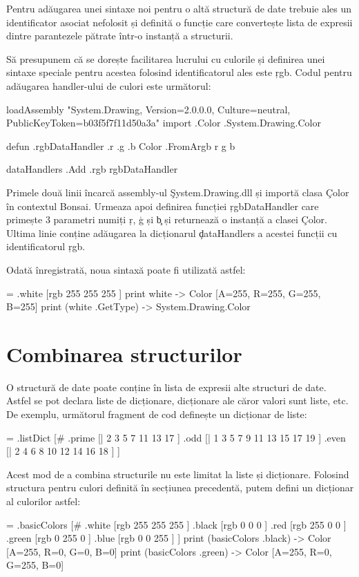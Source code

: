\documentclass[12pt,a4paper]{memoir}
\begin{document}
Pentru adăugarea unei sintaxe noi pentru o altă structură de date trebuie ales un identificator asociat nefolosit și definită o funcție care convertește lista de expresii dintre parantezele pătrate într-o instanță a structurii.

Să presupunem că se dorește facilitarea lucrului cu culorile și definirea unei sintaxe speciale pentru acestea folosind identificatorul ales este \c{rgb}. Codul pentru adăugarea handler-ului de culori este următorul:
\begin{code}
loadAssembly "System.Drawing, Version=2.0.0.0, Culture=neutral,
    PublicKeyToken=b03f5f7f11d50a3a"
import .Color .System.Drawing.Color

defun .rgbDataHandler .r .g .b {
	Color .FromArgb r g b
}

dataHandlers .Add .rgb rgbDataHandler
\end{code}
Primele două linii încarcă assembly-ul \c{System.Drawing.dll} și importă clasa \c{Color} în contextul Bonsai. Urmeaza apoi definirea funcției \c{rgbDataHandler} care primește 3 parametri numiți \c{r}, \c{g} și \c{b} și returnează o instanță a clasei \c{Color}. Ultima linie conține adăugarea la dicționarul \c{dataHandlers} a acestei funcții cu identificatorul \c{rgb}. 

Odată înregistrată, noua sintaxă poate fi utilizată astfel:
\begin{code}
= .white [rgb 255 255 255 ]
print white
  -> Color [A=255, R=255, G=255, B=255]
print (white .GetType)
  -> System.Drawing.Color
\end{code}

\section{Combinarea structurilor}

O structură de date poate conține în lista de expresii alte structuri de date. Astfel se pot declara liste de dicționare, dicționare ale căror valori sunt liste, etc. De exemplu, următorul fragment de cod definește un dicționar de liste:
\begin{code}
= .listDict [#
  .prime [| 2 3 5 7 11 13 17 ]
  .odd [| 1 3 5 7 9 11 13 15 17 19 ]
  .even [| 2 4 6 8 10 12 14 16 18 ]
]
\end{code}

Acest mod de a combina structurile nu este limitat la liste și dicționare. Folosind structura pentru culori definită în secțiunea precedentă, putem defini un dicționar al culorilor astfel:
\begin{code}
= .basicColors [#
  .white [rgb 255 255 255 ]
  .black [rgb 0 0 0 ]
  .red [rgb 255 0 0 ]
  .green [rgb 0 255 0 ]
  .blue [rgb 0 0 255 ]
]
print (basicColors .black)
  -> Color [A=255, R=0, G=0, B=0]
print (basicColors .green)
  -> Color [A=255, R=0, G=255, B=0]
\end{code}
\end{document}
